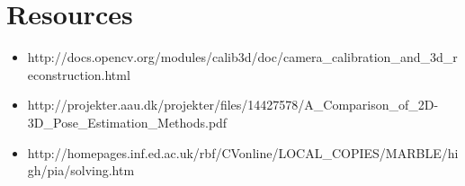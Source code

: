 \documentclass[]{article}
\providecommand{\tightlist}{%
  \setlength{\itemsep}{0pt}\setlength{\parskip}{0pt}}
\begin{document}
\section{Resources}\label{resources}

\begin{itemize}
\tightlist
\item
  http://docs.opencv.org/modules/calib3d/doc/camera\_calibration\_and\_3d\_reconstruction.html
\item
  http://projekter.aau.dk/projekter/files/14427578/A\_Comparison\_of\_2D-3D\_Pose\_Estimation\_Methods.pdf
\item
  http://homepages.inf.ed.ac.uk/rbf/CVonline/LOCAL\_COPIES/MARBLE/high/pia/solving.htm
\end{itemize}
\end{document}
